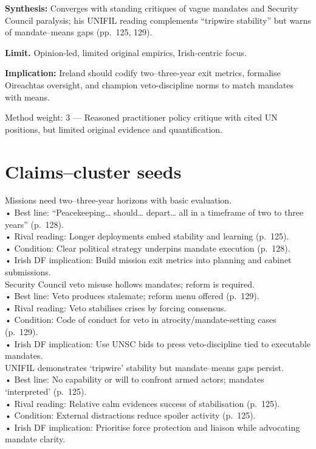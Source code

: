 \textbf{Synthesis:} Converges with standing critiques of vague mandates and Security Council paralysis; his UNIFIL reading complements “tripwire stability” but warns of mandate–means gaps (pp.~125, 129).  

\textbf{Limit.} Opinion-led, limited original empirics, Irish-centric focus.  

\textbf{Implication:} Ireland should codify two–three-year exit metrics, formalise Oireachtas oversight, and champion veto-discipline norms to match mandates with means.  

Method weight: 3 — Reasoned practitioner policy critique with cited UN positions, but limited original evidence and quantification.  

\section*{Claims–cluster seeds}  

Missions need two–three-year horizons with basic evaluation.\\
• Best line: “Peacekeeping… should… depart… all in a timeframe of two to three years” (p.~128).\\
• Rival reading: Longer deployments embed stability and learning (p.~125).\\
• Condition: Clear political strategy underpins mandate execution (p.~128).\\
• Irish DF implication: Build mission exit metrics into planning and cabinet submissions.\\

Security Council veto misuse hollows mandates; reform is required.\\
• Best line: Veto produces stalemate; reform menu offered (p.~129).\\
• Rival reading: Veto stabilises crises by forcing consensus.\\
• Condition: Code of conduct for veto in atrocity/mandate-setting cases (p.~129).\\
• Irish DF implication: Use UNSC bids to press veto-discipline tied to executable mandates.\\

UNIFIL demonstrates ‘tripwire’ stability but mandate–means gaps persist.\\
• Best line: No capability or will to confront armed actors; mandates ‘interpreted’ (p.~125).\\
• Rival reading: Relative calm evidences success of stabilisation (p.~125).\\
• Condition: External distractions reduce spoiler activity (p.~125).\\
• Irish DF implication: Prioritise force protection and liaison while advocating mandate clarity.\\

